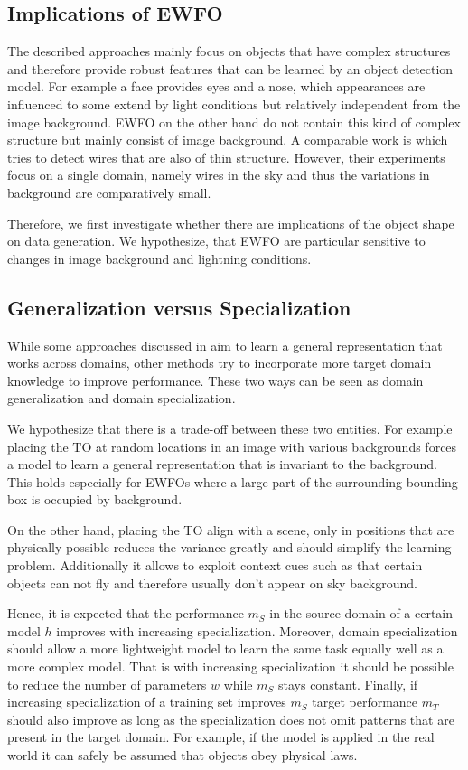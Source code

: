 \subsection{Implications of \ac{EWFO}}

The described approaches mainly focus on objects that have complex structures and therefore provide robust features that can be learned by an object detection model. For example a face provides eyes and a nose, which appearances are influenced to some extend by light conditions but relatively independent from the image background. \ac{EWFO} on the other hand do not contain this kind of complex structure but mainly consist of image background. A comparable work is \cite{Madaan2017} which tries to detect wires that are also of thin structure. However, their experiments focus on a single domain, namely wires in the sky and thus the variations in background are comparatively small.

Therefore, we first investigate whether there are implications of the object shape on data generation. We hypothesize, that \ac{EWFO} are particular sensitive to changes in image background and lightning conditions. 

\subsection{Generalization versus Specialization}
\label{sec:training:genvsspc}
While some approaches discussed in  aim to learn a general representation that works across domains, other methods try to incorporate more target domain knowledge to improve performance. These two ways can be seen as domain generalization and domain specialization.

We hypothesize that there is a trade-off between these two entities. For example placing the \ac{TO} at random locations in an image with various backgrounds forces a model to learn a general representation that is invariant to the background. This holds especially for \acp{EWFO} where a large part of the surrounding bounding box is occupied by background.

On the other hand, placing the \ac{TO} align with a scene, only in positions that are physically possible reduces the variance greatly and should simplify the learning problem. Additionally it allows to exploit context cues such as that certain objects can not fly and therefore usually don't appear on sky background.

Hence, it is expected that the performance $m_{S}$ in the source domain  of a certain model $h$ improves with increasing specialization. Moreover, domain specialization should allow a more lightweight model to learn the same task equally well as a more complex model. That is with increasing specialization it should be possible to reduce the number of parameters $w$ while $m_{S}$ stays constant. Finally, if increasing specialization of a training set improves $m_{S}$ target performance $m_T$ should also improve as long as the specialization does not omit patterns that are present in the target domain. For example, if the model is applied in the real world it can safely be assumed that objects obey physical laws.

